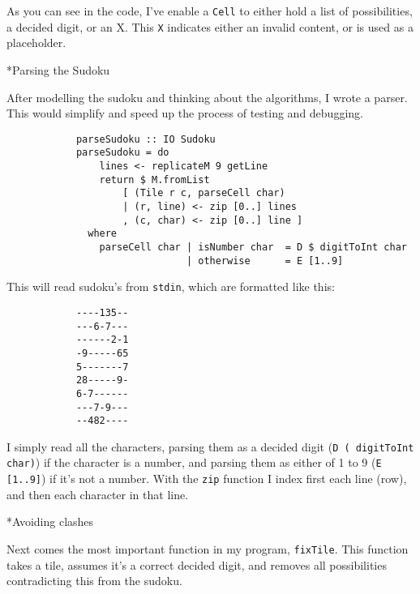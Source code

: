 \documentclass[a4paper,12pt]{article}
\begin{document}
\begin{section}
\begin{subsection}
\begin{subsubsection}
            As you can see in the code, I've enable a \texttt{Cell} to either hold a list of
            possibilities, a decided digit, or an X. This \texttt{X} indicates either an
            invalid content, or is used as a placeholder.

        \end{subsubsection}


        \begin{subsubsection}*{Parsing the Sudoku}

            After modelling the sudoku and thinking about the algorithms, I wrote a parser.
            This would simplify and speed up the process of testing and debugging.

            \begin{lstlisting}
            parseSudoku :: IO Sudoku
            parseSudoku = do
                lines <- replicateM 9 getLine
                return $ M.fromList
                    [ (Tile r c, parseCell char)
                    | (r, line) <- zip [0..] lines
                    , (c, char) <- zip [0..] line ]
              where
                parseCell char | isNumber char  = D $ digitToInt char
                               | otherwise      = E [1..9]
            \end{lstlisting}

            This will read sudoku's from \texttt{stdin}, which are formatted like this:

            \begin{verbatim}
            ----135--
            ---6-7---
            ------2-1
            -9-----65
            5-------7
            28-----9-
            6-7------
            ---7-9---
            --482----
            \end{verbatim}

            I simply read all the characters, parsing them as a decided digit (\texttt{D (
            digitToInt char)}) if the character is a number, and parsing them as either of 1
            to 9 (\texttt{E [1..9]}) if it's not a number. With the \texttt{zip} function I
            index first each line (row), and then each character in that line.

        \end{subsubsection}


        \begin{subsubsection}*{Avoiding clashes}

            Next comes the most important function in my program,
            \texttt{fixTile}. This function takes a tile, assumes it's a correct
            decided digit, and removes all possibilities contradicting this from
            the sudoku.


\end{subsubsection}
\end{subsection}
\end{section}
\end{document}
